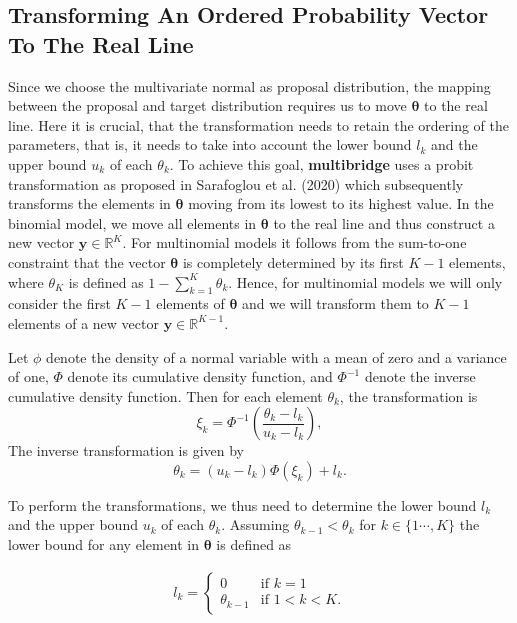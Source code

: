 \documentclass[
  english,
  man,floatsintext]{apa6}
\begin{document}
\begin{appendix}
\hypertarget{transforming-an-ordered-probability-vector-to-the-real-line}{%
\section{Transforming An Ordered Probability Vector To The Real
Line}\label{transforming-an-ordered-probability-vector-to-the-real-line}}

Since we choose the multivariate normal as proposal distribution, the
mapping between the proposal and target distribution requires us to move
\(\boldsymbol{\theta}\) to the real line. Here it is crucial, that the
transformation needs to retain the ordering of the parameters, that is,
it needs to take into account the lower bound \(l_k\) and the upper
bound \(u_k\) of each \(\theta_k\). To achieve this goal,
\textbf{multibridge} uses a probit transformation as proposed in
Sarafoglou et al. (2020) which subsequently transforms the elements in
\(\boldsymbol{\theta}\) moving from its lowest to its highest value. In
the binomial model, we move all elements in \(\boldsymbol{\theta}\) to
the real line and thus construct a new vector
\(\boldsymbol{y} \in \mathbb{R}^{K}\). For multinomial models it follows
from the sum-to-one constraint that the vector \(\boldsymbol{\theta}\)
is completely determined by its first \(K - 1\) elements, where
\(\theta_K\) is defined as \(1 - \sum_{k = 1}^K \theta_k\). Hence, for
multinomial models we will only consider the first \(K - 1\) elements of
\(\boldsymbol{\theta}\) and we will transform them to \(K - 1\) elements
of a new vector \(\boldsymbol{y} \in \mathbb{R}^{K - 1}\).

Let \(\phi\) denote the density of a normal variable with a mean of zero
and a variance of one, \(\Phi\) denote its cumulative density function,
and \(\Phi^{-1}\) denote the inverse cumulative density function. Then
for each element \(\theta_k\), the transformation is
\[\xi_k = \Phi^{-1}\left(\frac{\theta_k - l_k}{u_k - l_k}\right),\] The
inverse transformation is given by
\[\theta_k = (u_k - l_k) \Phi(\xi_k) + l_k.\]

To perform the transformations, we thus need to determine the lower
bound \(l_k\) and the upper bound \(u_k\) of each \(\theta_k\). Assuming
\(\theta_{k-1} < \theta_{k}\) for \(k \in \{1 \cdots, K\}\) the lower
bound for any element in \(\boldsymbol{\theta}\) is defined as

\begin{align*}
l_k = \left.
\begin{cases}
0 & \text{if } k = 1 \\
\theta_{k - 1} & \text{if } 1 < k < K.
\end{cases}
\right.
\end{align*}


\end{appendix}
\end{document}
